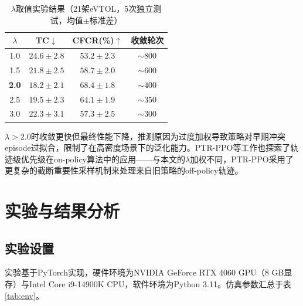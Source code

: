 \documentclass[12pt,a4paper,UTF8]{ctexart}
\begin{document}
\begin{table}[H]
    \centering
    \caption{$\lambda$取值实验结果（21架eVTOL，5次独立测试，均值$\pm$标准差）}
    \label{tab:lambda}
    \begin{tabular}{|c|c|c|c|}
        \hline
        $\lambda$ & TC$\downarrow$ & CFCR(\%)$\uparrow$ & 收敛轮次 \\
        \hline
        1.0 & $24.6 \pm 2.8$ & $53.2 \pm 2.3$ & $\sim800$ \\
        1.5 & $21.8 \pm 2.5$ & $58.7 \pm 2.0$ & $\sim600$ \\
        \textbf{2.0} & $\mathbf{18.2 \pm 2.1}$ & $\mathbf{68.4 \pm 1.8}$ & $\sim400$ \\
        2.5 & $19.5 \pm 2.3$ & $64.1 \pm 1.9$ & $\sim350$ \\
        3.0 & $22.3 \pm 3.1$ & $57.3 \pm 2.5$ & $\sim300$ \\
        \hline
    \end{tabular}
\end{table}

$\lambda > 2.0$时收敛更快但最终性能下降，推测原因为过度加权导致策略对早期冲突episode过拟合，限制了在高密度场景下的泛化能力。PTR-PPO\cite{ref27}等工作也探索了轨迹级优先级在on-policy算法中的应用——与本文的$\lambda$加权不同，PTR-PPO采用了更复杂的截断重要性采样机制来处理来自旧策略的off-policy轨迹。

\section{实验与结果分析}

\subsection{实验设置}

实验基于PyTorch实现，硬件环境为NVIDIA GeForce RTX 4060 GPU（8 GB显存）与Intel Core i9-14900K CPU，软件环境为Python 3.11。仿真参数汇总于表\ref{tab:env}。
\end{document}
